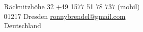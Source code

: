 \color{header-blue}

	\section*{\Huge \name}

	R\"acknitzh\"ohe 32 \hfill +49 1577 51 78 737 (mobil)\\
	01217 Dresden \hfill \href{mailto:ronnybrendel@gmail.com}{ronnybrendel@gmail.com}\\
	Deutschland \hfill

\color{black}

\vspace{0.6cm}
